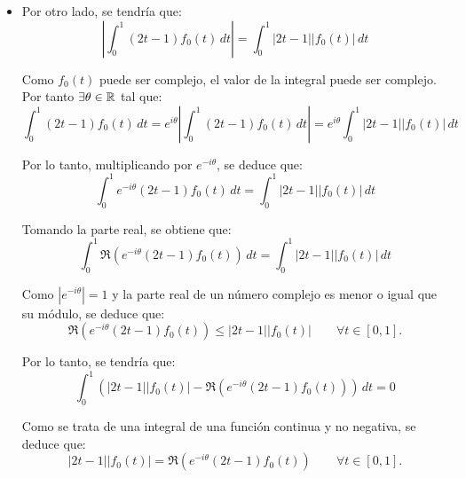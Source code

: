 \documentclass[12pt]{article}
\begin{document}
\begin{ejercicio}
\begin{enumerate}[label=\alph*)]
\begin{itemize}
                Notemos que, como $f_0$ puede tomar valores complejos, no se puede llegar a una contradicción directa.

                \item Por otro lado, se tendría que:
                \begin{equation*}
                    \left|\int_0^1 (2t - 1) f_0(t) \, dt\right| = \int_0^1 |2t - 1| |f_0(t)| \, dt
                \end{equation*}

                Como $f_0(t)$ puede ser complejo, el valor de la integral puede ser complejo. Por tanto $\exists \theta\in \mathbb{R}$ tal que:
                \begin{equation*}
                    \int_0^1 (2t - 1) f_0(t) \, dt = e^{i\theta} \left|\int_0^1 (2t - 1) f_0(t) \, dt\right| = e^{i\theta} \int_0^1 |2t - 1| |f_0(t)| \, dt
                \end{equation*}

                Por lo tanto, multiplicando por $e^{-i\theta}$, se deduce que:
                \begin{equation*}
                    \int_0^1 e^{-i\theta} (2t - 1) f_0(t) \, dt = \int_0^1 |2t - 1| |f_0(t)| \, dt
                \end{equation*}

                Tomando la parte real, se obtiene que:
                \begin{equation*}
                    \int_0^1 \Re\left(e^{-i\theta} (2t - 1) f_0(t)\right) \, dt = \int_0^1 |2t - 1| |f_0(t)| \, dt
                \end{equation*}

                Como $|e^{-i\theta}|=1$ y la parte real de un número complejo es menor o igual que su módulo, se deduce que:
                \begin{equation*}
                    \Re\left(e^{-i\theta} (2t - 1) f_0(t)\right) \leq |2t - 1| |f_0(t)| \qquad \forall t \in [0, 1].
                \end{equation*}

                Por lo tanto, se tendría que:
                \begin{equation*}
                    \int_0^1 \left(|2t - 1| |f_0(t)| - \Re\left(e^{-i\theta} (2t - 1) f_0(t)\right)\right) \, dt = 0
                \end{equation*}

                Como se trata de una integral de una función continua y no negativa, se deduce que:
                \begin{equation*}
                    |2t - 1| |f_0(t)| = \Re\left(e^{-i\theta} (2t - 1) f_0(t)\right) \qquad \forall t \in [0, 1].
                \end{equation*}


\end{itemize}
\end{enumerate}
\end{ejercicio}
\end{document}

